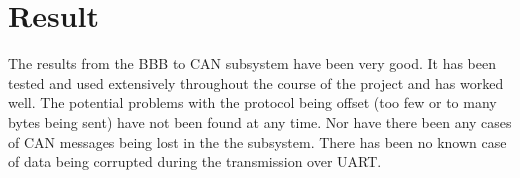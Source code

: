 
\section{Result}\label{sec:result}
The results from the BBB to CAN subsystem have been very good. It has been tested and used extensively throughout the course of the project and has worked well. \newline
The potential problems with the protocol being offset (too few or to many bytes being sent) have not been found at any time. Nor have there been any cases of CAN messages being lost in the the subsystem. \newline
There has been no known case of data being corrupted during the transmission over UART.
